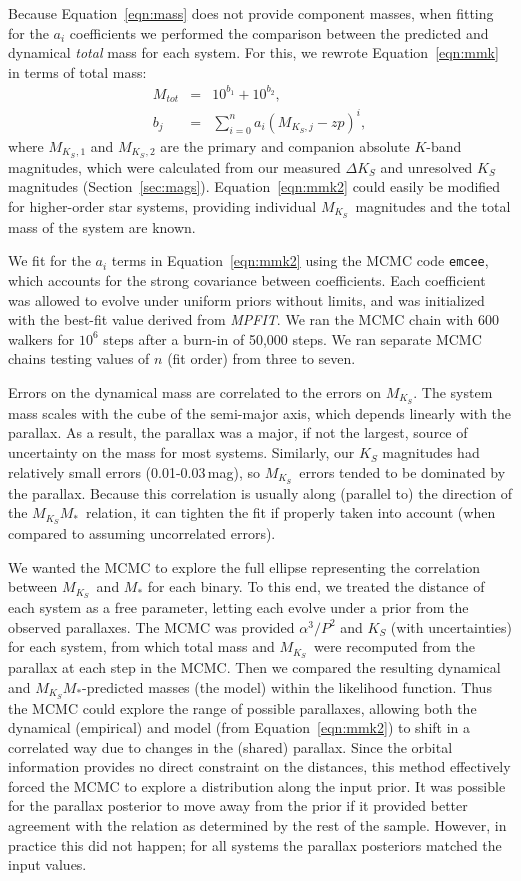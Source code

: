 \documentclass[twocolumn]{aastex62}
\newcommand{\mks}{$M_{K_S}$}
\newcommand{\mmk}{$M_{K_S}$\textendash$M_*$}
\begin{document}
Because Equation~\ref{eqn:mass} does not provide component masses, when fitting for the $a_i$ coefficients we performed the comparison between the predicted and dynamical {\it total} mass for each system. For this, we rewrote Equation~\ref{eqn:mmk} in terms of total mass:
\begin{eqnarray}\label{eqn:mmk2}
M_{tot} &=& 10^{b_1} + 10^{b_2},\\
b_j &=& \sum_{i=0}^{n} a_i(M_{K_S,j}-zp)^i, \label{eqn:mmk2_b}
\end{eqnarray}
where \mks$_{,1}$ and \mks$_{,2}$ are the primary and companion absolute $K$-band magnitudes, which were calculated from our measured $\Delta K_S$ and unresolved $K_S$ magnitudes (Section~\ref{sec:mags}). Equation~\ref{eqn:mmk2} could easily be modified for higher-order star systems, providing individual \mks\ magnitudes and the total mass of the system are known. 

We fit for the $a_i$ terms in Equation~\ref{eqn:mmk2} using the MCMC code {\tt emcee}, which accounts for the strong covariance between coefficients. Each coefficient was allowed to evolve under uniform priors without limits, and was initialized with the best-fit value derived from \textit{MPFIT}. We ran the MCMC chain with 600 walkers for $10^6$ steps after a burn-in of 50,000 steps. We ran separate MCMC chains testing values of $n$ (fit order) from three to seven. 

Errors on the dynamical mass are correlated to the errors on \mks. The system mass scales with the cube of the semi-major axis, which depends linearly with the parallax. As a result, the parallax was a major, if not the largest, source of uncertainty on the mass for most systems. Similarly, our $K_S$ magnitudes had relatively small errors (0.01-0.03\,mag), so \mks\ errors tended to be dominated by the parallax. Because this correlation is usually along (parallel to) the direction of the \mmk\ relation, it can tighten the fit if properly taken into account (when compared to assuming uncorrelated errors). 

We wanted the MCMC to explore the full ellipse representing the correlation between \mks\ and $M_*$ for each binary. To this end, we treated the distance of each system as a free parameter, letting each evolve under a prior from the observed parallaxes. The MCMC was provided $\alpha^3/P^2$ and $K_S$ (with uncertainties) for each system, from which total mass and \mks\ were recomputed from the parallax at each step in the MCMC. Then we compared the resulting dynamical and \mmk-predicted masses (the model) within the likelihood function. Thus the MCMC could explore the range of possible parallaxes, allowing both the dynamical (empirical) and model (from Equation~\ref{eqn:mmk2}) to shift in a correlated way due to changes in the (shared) parallax. Since the orbital information provides no direct constraint on the distances, this method effectively forced the MCMC to explore a distribution along the input prior. It was possible for the parallax posterior to move away from the prior if it provided better agreement with the relation as determined by the rest of the sample. However, in practice this did not happen; for all systems the parallax posteriors matched the input values. 
\end{document}
